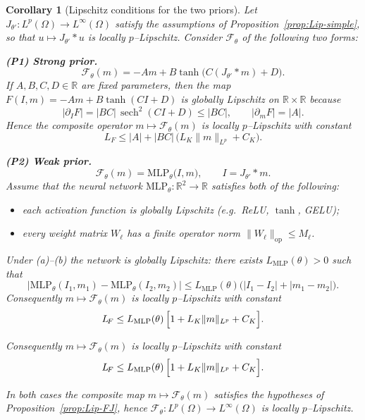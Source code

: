 \documentclass[11pt,a4paper]{article}
\theoremstyle{plain}
\newtheorem{corollary}[theorem]{Corollary}
\theoremstyle{definition}
\theoremstyle{remark}
\begin{document}
\begin{corollary}[Lipschitz conditions for the two priors]\label{cor:priors-Lip}
	Let $J_{\theta'}:L^p(\Omega)\to L^\infty(\Omega)$ satisfy the assumptions of
	Proposition~\ref{prop:Lip-simple}, so that $u\mapsto J_{\theta'}*u$ is locally
	$p$--Lipschitz.
	Consider $\mathcal F_\theta$ of the following two forms:

	\smallskip
	\noindent
	\textbf{(P1) Strong prior.}
	\[
		\mathcal F_\theta(m)
		= -A m + B \tanh\!\bigl(C (J_{\theta'}*m)+D\bigr).
	\]
	If $A,B,C,D\in\mathbb R$ are fixed parameters, then the map
	$F(I,m)=-Am+B\tanh(C I + D)$ is globally Lipschitz on
	$\mathbb R\times\mathbb R$ because
	\[
		\bigl|\partial_I F\bigr| = |B C|\,\operatorname{sech}^2(C I + D)\le |B C|,
		\qquad
		\bigl|\partial_m F\bigr| = |A|.
	\]
	Hence the composite operator $m\mapsto\mathcal F_\theta(m)$ is locally
	$p$--Lipschitz with constant
	\[
		L_{\!F}
		\le |A| + |B C|\,\bigl(L_K\|m\|_{L^p}+C_K\bigr).
	\]

	\smallskip
	\noindent
	\textbf{(P2) Weak prior.}
	\[
		\mathcal F_\theta(m)
		= \mathrm{MLP}_\theta\!\bigl(I,m\bigr),
		\qquad I=J_{\theta'}*m.
	\]
	Assume that the neural network $\mathrm{MLP}_\theta:\mathbb R^2\to\mathbb R$
	satisfies \emph{both} of the following:
	\begin{itemize}
		\item[(a)] each activation function is globally Lipschitz
		      (e.g.\ ReLU, $\tanh$, GELU);
		\item[(b)] every weight matrix $W_\ell$ has a finite operator norm
		      $\|W_\ell\|_{\mathrm{op}}\le M_\ell$.
	\end{itemize}
	Under (a)–(b) the network is globally Lipschitz:
	there exists $L_{\mathrm{MLP}}(\theta)>0$ such that
	\[
		\bigl|\mathrm{MLP}_\theta(I_1,m_1)
		-\mathrm{MLP}_\theta(I_2,m_2)\bigr|
		\le L_{\mathrm{MLP}}(\theta)\bigl(|I_1-I_2|+|m_1-m_2|\bigr).
	\]
	Consequently $m\mapsto \mathcal F_\theta(m)$ is locally
	$p$--Lipschitz with constant
	\[
		L_{\!F}
		\le L_{\mathrm{MLP}}(\theta)\,
		\Bigl[1 + L_K\|m\|_{L^p} + C_K\Bigr].
	\]

	Consequently $m\mapsto \mathcal F_\theta(m)$ is locally
	$p$--Lipschitz with constant
	\[
		L_{\!F}
		\le L_{\mathrm{MLP}}(\theta)\,
		\Bigl[1 + L_K\|m\|_{L^p} + C_K\Bigr].
	\]

	\smallskip
	In both cases the composite map $m\mapsto\mathcal F_\theta(m)$ satisfies
	the hypotheses of Proposition~\ref{prop:Lip-FJ}, hence
	$\mathcal F_\theta:L^p(\Omega)\to L^\infty(\Omega)$
	is locally $p$--Lipschitz.


\end{corollary}
\end{document}

